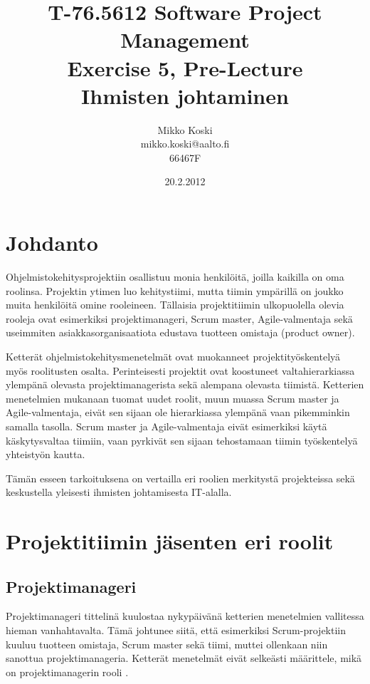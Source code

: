 \documentclass[a4paper]{article}
\begin{document}
\title{\small T-76.5612 Software Project Management \\ Exercise 5, Pre-Lecture \\ \huge Ihmisten johtaminen}
\date{20.2.2012}
\author{Mikko Koski \\ mikko.koski@aalto.fi \\ 66467F}
\maketitle

\normalsize

\section{Johdanto}

Ohjelmistokehitysprojektiin osallistuu monia henkilöitä, joilla kaikilla on oma roolinsa. Projektin ytimen luo kehitystiimi, mutta tiimin ympärillä on joukko muita henkilöitä omine rooleineen. Tällaisia projektitiimin ulkopuolella olevia rooleja ovat esimerkiksi projektimanageri, Scrum master, Agile-valmentaja sekä useimmiten asiakkasorganisaatiota edustava tuotteen omistaja (product owner).

Ketterät ohjelmistokehitysmenetelmät ovat muokanneet projektityöskentelyä myös roolitusten osalta. Perinteisesti projektit ovat koostuneet valtahierarkiassa ylempänä olevasta projektimanagerista sekä alempana olevasta tiimistä. Ketterien menetelmien mukanaan tuomat uudet roolit, muun muassa Scrum master ja Agile-valmentaja, eivät sen sijaan ole hierarkiassa ylempänä vaan pikemminkin samalla tasolla. Scrum master ja Agile-valmentaja eivät esimerkiksi käytä käskytysvaltaa tiimiin, vaan pyrkivät sen sijaan tehostamaan tiimin työskentelyä yhteistyön kautta.

Tämän esseen tarkoituksena on vertailla eri roolien merkitystä projekteissa sekä keskustella yleisesti ihmisten johtamisesta IT-alalla.

\section{Projektitiimin jäsenten eri roolit}

\subsection{Projektimanageri}

Projektimanageri tittelinä kuulostaa nykypäivänä ketterien menetelmien vallitessa hieman vanhahtavalta. Tämä johtunee siitä, että esimerkiksi Scrum-projektiin kuuluu tuotteen omistaja, Scrum master sekä tiimi, muttei ollenkaan niin sanottua projektimanageria. Ketterät menetelmät eivät selkeästi määrittele, mikä on projektimanagerin rooli \citep{augustine2005}.
\end{document}
